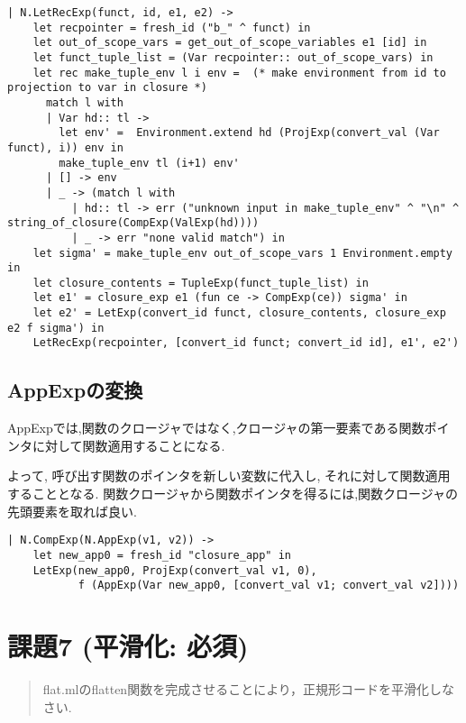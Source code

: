 \begin{lstlisting}[caption=LetRec式の実装]
| N.LetRecExp(funct, id, e1, e2) -> 
    let recpointer = fresh_id ("b_" ^ funct) in
    let out_of_scope_vars = get_out_of_scope_variables e1 [id] in
    let funct_tuple_list = (Var recpointer:: out_of_scope_vars) in
    let rec make_tuple_env l i env =  (* make environment from id to projection to var in closure *)
      match l with 
      | Var hd:: tl ->
        let env' =  Environment.extend hd (ProjExp(convert_val (Var funct), i)) env in
        make_tuple_env tl (i+1) env'
      | [] -> env
      | _ -> (match l with 
          | hd:: tl -> err ("unknown input in make_tuple_env" ^ "\n" ^ string_of_closure(CompExp(ValExp(hd))))
          | _ -> err "none valid match") in
    let sigma' = make_tuple_env out_of_scope_vars 1 Environment.empty in
    let closure_contents = TupleExp(funct_tuple_list) in
    let e1' = closure_exp e1 (fun ce -> CompExp(ce)) sigma' in
    let e2' = LetExp(convert_id funct, closure_contents, closure_exp e2 f sigma') in
    LetRecExp(recpointer, [convert_id funct; convert_id id], e1', e2')
\end{lstlisting}

\subsection*{AppExpの変換}

AppExpでは,関数のクロージャではなく,クロージャの第一要素である関数ポインタに対して関数適用することになる. 

よって, 呼び出す関数のポインタを新しい変数に代入し, それに対して関数適用することとなる. 
関数クロージャから関数ポインタを得るには,関数クロージャの先頭要素を取れば良い.

\begin{lstlisting}[caption=AppExpの実装]
| N.CompExp(N.AppExp(v1, v2)) -> 
    let new_app0 = fresh_id "closure_app" in
    LetExp(new_app0, ProjExp(convert_val v1, 0), 
           f (AppExp(Var new_app0, [convert_val v1; convert_val v2])))
\end{lstlisting}

\section*{課題7 (平滑化: 必須)}

\begin{quotation}
flat.mlのflatten関数を完成させることにより，正規形コードを平滑化しなさい.
\end{quotation}


